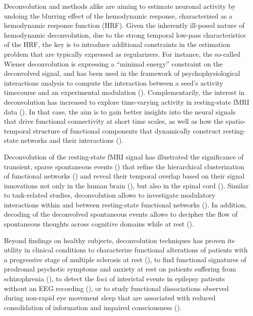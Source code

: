 Deconvolution and methods alike are aiming to estimate neuronal activity by undoing the blurring effect of the hemodynamic response, characterized as a hemodynamic response function (HRF). Given the inherently ill-posed nature of hemodynamic deconvolution, due to the strong temporal low-pass characteristics of the HRF, the key is to introduce additional constraints in the estimation problem that are typically expressed as regularizers. For instance, the so-called Wiener deconvolution is expressing a ``minimal energy'' constraint on the deconvolved signal, and has been used in the framework of psychophysiological interactions analysis to compute the interaction between a seed's activity timecourse and an experimental modulation (\citealt{glover1999deconvolution,gitelman2003ModelingRegionalPsychophysiologic,Di2019,Gerchen2014,Freitas2020}). Complementarily, the interest in deconvolution has increased to explore time-varying activity in resting-state fMRI data (\citealt{Bolton2020,Preti2017,Keilholz2017,Lurie2020}). In that case, the aim is to gain better insights into the neural signals that drive functional connectivity at short time scales, as well as how the spatio-temporal structure of functional components that dynamically construct resting-state networks and their interactions (\citealt{karahanoglu2017DynamicsLargescalefMRI}).

Deconvolution of the resting-state fMRI signal has illustrated the significance of transient, sparse spontaneous events (\citealt{petridou2013PeriodsRestfMRI,allan2015FunctionalConnectivityMRI}) that refine the hierarchical clusterization of functional networks (\citealt{Karahanoglu2013}) and reveal their temporal overlap based on their signal innovations not only in the human brain (\citealt{karahanoglu2015TransientBrainActivity}), but also in the spinal cord (\citealt{kinany2020DynamicFunctionalConnectivity}). Similar to task-related studies, deconvolution allows to investigate modulatory interactions within and between resting-state functional networks (\citealt{Di2013,Di2015}). In addition, decoding of the deconvolved spontaneous events allows to decipher the flow of spontaneous thoughts across cognitive domains while at rest (\citealt{gonzalez-castillo2019ImagingSpontaneousFlow,karahanoglu2015TransientBrainActivity}).

Beyond findings on healthy subjects, deconvolution techniques has proven its utility in clinical conditions to characterize functional alterations of patients with a progressive stage of multiple sclerosis at rest (\citealt{bommarito2020FunctionalNetworkDynamicsa}), to find functional signatures of prodromal psychotic symptoms and anxiety at rest on patients suffering from schizophrenia (\citealt{zoller2019LargeScaleBrainNetwork}), to detect the foci of interictal events in epilepsy patients without an EEG recording (\citealt{lopes2012DetectionEpilepticActivity}), or to study functional dissociations observed during non-rapid eye movement sleep that are associated with reduced consolidation of information and impaired consciousness (\citealt{tarun2021NREMSleepStagesa}).

